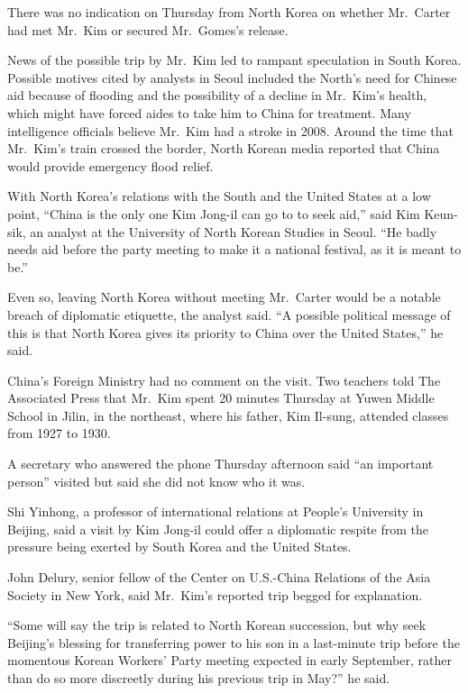 ﻿\documentclass[12pt]{article}
\begin{document}
There was no indication on Thursday from North Korea on whether Mr.~Carter had met Mr.~Kim or
secured Mr.~Gomes's release.

News of the possible trip by Mr.~Kim led to rampant speculation in South Korea. Possible motives
cited by analysts in Seoul included the North's need for Chinese aid because of flooding and the
possibility of a decline in Mr.~Kim's health, which might have forced aides to take him to China for
treatment. Many intelligence officials believe Mr.~Kim had a stroke in 2008. Around the time that
Mr.~Kim's train crossed the border, North Korean media reported that China would provide emergency
flood relief.

With North Korea's relations with the South and the United States at a low point, ``China is the
only one Kim Jong-il can go to to seek aid,'' said Kim Keun-sik, an analyst at the University of
North Korean Studies in Seoul. ``He badly needs aid before the party meeting to make it a national
festival, as it is meant to be.''

Even so, leaving North Korea without meeting Mr.~Carter would be a notable breach of diplomatic
etiquette, the analyst said. ``A possible political message of this is that North Korea gives its
priority to China over the United States,'' he said.

China's Foreign Ministry had no comment on the visit. Two teachers told The Associated Press that
Mr.~Kim spent 20 minutes Thursday at Yuwen Middle School in Jilin, in the northeast, where his
father, Kim Il-sung, attended classes from 1927 to 1930.

A secretary who answered the phone Thursday afternoon said ``an important person'' visited but said
she did not know who it was.

Shi Yinhong, a professor of international relations at People's University in Beijing, said a visit
by Kim Jong-il could offer a diplomatic respite from the pressure being exerted by South Korea and
the United States.

John Delury, senior fellow of the Center on U.S.-China Relations of the Asia Society in New York,
said Mr.~Kim's reported trip begged for explanation.

``Some will say the trip is related to North Korean succession, but why seek Beijing's blessing for
transferring power to his son in a last-minute trip before the momentous Korean Workers' Party
meeting expected in early September, rather than do so more discreetly during his previous trip in
May?'' he said.
\end{document}
